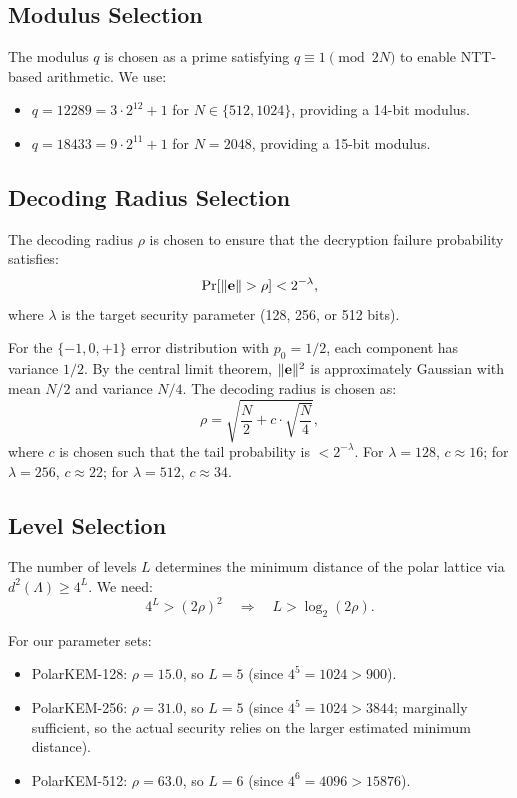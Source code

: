 \documentclass[11pt,a4paper]{article}
\DeclarePairedDelimiter{\norm}{\lVert}{\rVert}
\begin{document}
\subsection{Modulus Selection}

The modulus $q$ is chosen as a prime satisfying $q \equiv 1 \pmod{2N}$ to enable NTT-based arithmetic. We use:
\begin{itemize}[leftmargin=2em]
\item $q = 12289 = 3 \cdot 2^{12} + 1$ for $N \in \{512, 1024\}$, providing a 14-bit modulus.
\item $q = 18433 = 9 \cdot 2^{11} + 1$ for $N = 2048$, providing a 15-bit modulus.
\end{itemize}

\subsection{Decoding Radius Selection}

The decoding radius $\rho$ is chosen to ensure that the decryption failure probability satisfies:
\[
\Pr[\norm{\mathbf{e}} > \rho] < 2^{-\lambda},
\]
where $\lambda$ is the target security parameter (128, 256, or 512 bits).

For the $\{-1, 0, +1\}$ error distribution with $p_0 = 1/2$, each component has variance $1/2$. By the central limit theorem, $\norm{\mathbf{e}}^2$ is approximately Gaussian with mean $N/2$ and variance $N/4$. The decoding radius is chosen as:
\[
\rho = \sqrt{\frac{N}{2} + c \cdot \sqrt{\frac{N}{4}}},
\]
where $c$ is chosen such that the tail probability is $< 2^{-\lambda}$. For $\lambda = 128$, $c \approx 16$; for $\lambda = 256$, $c \approx 22$; for $\lambda = 512$, $c \approx 34$.

\subsection{Level Selection}

The number of levels $L$ determines the minimum distance of the polar lattice via $d^2(\Lambda) \geq 4^L$. We need:
\[
4^L > (2\rho)^2 \quad \Rightarrow \quad L > \log_2(2\rho).
\]

For our parameter sets:
\begin{itemize}[leftmargin=2em]
\item PolarKEM-128: $\rho = 15.0$, so $L = 5$ (since $4^5 = 1024 > 900$).
\item PolarKEM-256: $\rho = 31.0$, so $L = 5$ (since $4^5 = 1024 > 3844$; marginally sufficient, so the actual security relies on the larger estimated minimum distance).
\item PolarKEM-512: $\rho = 63.0$, so $L = 6$ (since $4^6 = 4096 > 15876$).
\end{itemize}
\end{document}
